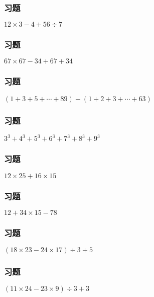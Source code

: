 \begin{frame}
    \frametitle{习题\theframecounter}
    \vspace*{-3cm}    \centering\textit{\Large $12\times 3 - 4 + 56\div 7$}
\end{frame}

\begin{frame}
    \frametitle{习题\theframecounter} 
    \vspace*{-3cm}   \centering\textit{\Large $67\times 67 - 34 + 67 + 34$}
\end{frame}

\begin{frame}
    \frametitle{习题\theframecounter} 
    \vspace*{-3cm}   \centering\textit{\Large $(1+3+5+\cdots + 89) - (1+2+3+\cdots + 63)$}
\end{frame}

\begin{frame}
    \frametitle{习题\theframecounter}  
    \vspace*{-3cm}  \centering\textit{\Large $3^3 + 4^3 + 5^3 + 6^3 + 7^3 + 8^3 + 9^3$}
\end{frame}

\begin{frame}
    \frametitle{习题\theframecounter} 
    \vspace*{-3cm}   \centering\textit{\Large $12\times 25 + 16\times 15$}
\end{frame}

\begin{frame}
    \frametitle{习题\theframecounter}
    \vspace*{-3cm}    \centering\textit{\Large $12 + 34\times 15 -78$}
\end{frame}

\begin{frame}
    \frametitle{习题\theframecounter}
    \vspace*{-3cm}    \centering\textit{\Large $(18\times 23 - 24\times 17)\div 3 + 5$}
\end{frame}

\begin{frame}
    \frametitle{习题\theframecounter}
    \vspace*{-3cm}    \centering\textit{\Large $(11\times 24 - 23\times 9)\div 3 + 3$}
\end{frame}

